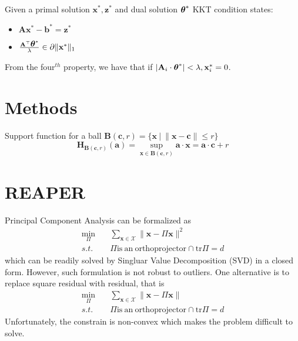 \documentclass[
10pt, %
a4paper, %
oneside, %
headinclude,footinclude, %
BCOR5mm, %
]{scrartcl}
\newcommand{\AB}{\mathbf{A}}
\newcommand{\BB}{\mathbf{B}}
\newcommand{\HB}{\mathbf{H}}
\newcommand{\aB}{\mathbf{a}}
\newcommand{\bB}{\mathbf{b}}
\newcommand{\cB}{\mathbf{c}}
\newcommand{\xB}{\mathbf{x}}
\newcommand{\zB}{\mathbf{z}}
\newcommand{\XM}{\mathcal{X}}
\newcommand{\thetaB}{\mbox{\boldmath$\theta$\unboldmath}}
\begin{document}
Given a primal solution $\xB^*, \zB^*$ and dual solution $\thetaB^*$ KKT condition states:
\begin{itemize}
	\item $\AB\xB^* - \bB^* = \zB^*$
	\item $\frac{\AB^\top\thetaB^*}{\lambda} \in \partial \|\xB^*\|_1$
\end{itemize}
From the four$^{th}$ property, we have that if $|\AB_i \cdot \thetaB^*| < \lambda, \xB_i^* = 0$.



\section{Methods}

Support function for a ball $\BB(\cB, r) = \{\xB ~|~ \|\xB-\cB\|\leq r\}$
\begin{equation}
	\HB_{\BB(\cB, r)}(\aB) = \sup_{\xB \in \BB(\cB, r)} \aB\cdot\xB = \aB\cdot\cB + r
\end{equation}



\section{REAPER}
Principal Component Analysis can be formalized as 
\begin{equation}
	\begin{aligned}
		\min_{\Pi} & \quad \sum_{\xB \in \XM} \|\xB - \Pi\xB\|^2 \\
		s.t. & \quad \Pi \mathrm{is~an~orthoprojector} \cap \mathrm{tr} \Pi = d
	\end{aligned}
	\label{eqn: square residual PCA}
\end{equation}
which can be readily solved by Singluar Value Decomposition (SVD) in a closed form.
However, such formulation is not robust to outliers. One alternative is to replace square residual with residual, that is 
\begin{equation}
	\begin{aligned}
		\min_{\Pi} & \quad \sum_{\xB \in \XM} \|\xB - \Pi\xB\| \\
		s.t. & \quad \Pi \mathrm{is~an~orthoprojector} \cap \mathrm{tr} \Pi = d
	\end{aligned}
	\label{eqn: residual PCA}
\end{equation}
Unfortunately, the constrain is non-convex which makes the problem difficult to solve.
\end{document}
